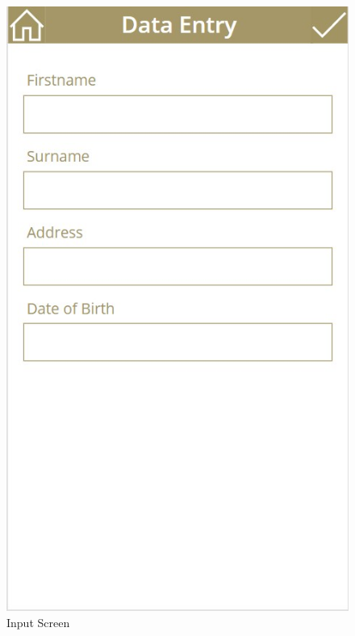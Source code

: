 \begin{figure}
	\centering
	\includegraphics[width=0.7\linewidth]{./DataEntry.jpg}
	\caption{Input Screen}
	\label{fig:InputScreen}
\end{figure}



